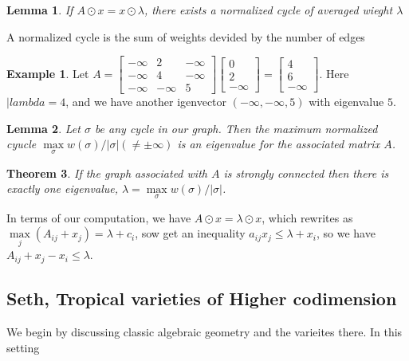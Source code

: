 \documentclass[11pt]{article}
\newtheorem{prototheorem}{Theorem}[section]
\newenvironment{theorem}
   {\begin{prototheorem}}
   {\end{prototheorem}}
\newtheorem{protolemma}[prototheorem]{Lemma}
\newenvironment{lemma}
   {\begin{protolemma}}
   {\end{protolemma}}
\theoremstyle{definition}
\newtheorem{protoexample}{Example}[section]
\newenvironment{ex}
   {\begin{protoexample}}
   {\end{protoexample}}
\begin{document}
\begin{lemma}
    If $A\odot x = x \odot \lambda$, there exists a normalized cycle of averaged wieght $\lambda$
\end{lemma}

A normalized cycle is the sum of weights devided by the number of edges
\begin{ex}
Let $A = \begin{bmatrix}
    -\infty & 2 & - \infty\\ -\infty &4 & - \infty \\ -\infty & - \infty &5
\end{bmatrix} \begin{bmatrix}
    0\\2\\-\infty
\end{bmatrix}= \begin{bmatrix}
    4 \\ 6 \\-\infty
\end{bmatrix}.$ Here $|lambda = 4$, and we have another igenvector $(-\infty, -\infty, 5)$ with eigenvalue $5$.
\end{ex}



\begin{lemma}
    Let $\sigma$ be any cycle in our graph. Then the maximum normalized cyucle $\max\limits_{\sigma} w(\sigma)/|\sigma| (\neq \pm \infty)$ is an eigenvalue for the associated matrix $A$.
\end{lemma}


\begin{theorem}
    If the graph  associated with $A$ is strongly connected then there is exactly one eigenvalue, $\lambda=\max\limits_{\sigma} w(\sigma)/|\sigma|$.
\end{theorem}


In terms of our computation, we have $A \odot x = \lambda \odot x$, which rewrites as $\max\limits_{j} (A_{ij} + x_j) = \lambda + c_i$, sow  get an inequality $a_{ij} x_j \leq \lambda + x_i$, so we have $A_{ij}+x_j-x_i\leq\lambda$.




\subsection{Seth, Tropical varieties of Higher codimension}

We begin by discussing classic algebraic geometry and the varieites there. In this setting
\end{document}
